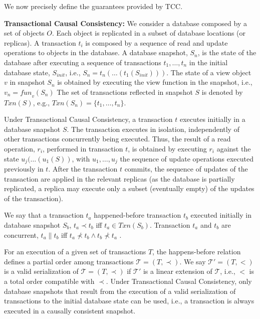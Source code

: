 \documentclass[sigplan,review,anonymous]{acmart}
\begin{document}
We now precisely define the guarantees provided by TCC.

\noindent
\textbf{Transactional Causal Consistency:}
We consider a database composed by a set of objects $O$. Each object is replicated in a subset of 
database locations (or replicas).
A transaction $t_i$ is composed by a sequence of read and update operations to objects in the database.
A database snapshot, $S_n$, is the state of the database after executing a sequence of 
transactions $t_1,\ldots,t_n$ in the initial database state, $S_{init}$, i.e., $S_n =
t_n(\ldots(t_1(S_{init})))$.  The state of a view object $v$ in snapshot $S_n$ is obtained by executing
the view function in the snapshot, i.e.,  $v_n = \mathit{fun}_v(S_n)$
The set of transactions reflected in snapshot $S$ is denoted by $Txn(S)$,
e.g., $Txn(S_n) = \{t_1,\ldots,t_n\}$.

Under Transactional Causal Consistency, a transaction $t$  executes initially in a database snapshot $S$.
The transaction executes in isolation, independently of other transactions concurrently being executed. 
Thus, the result of a read operation, $r_i$, performed in transaction $t$, is obtained by executing $r_i$
against the state $u_j(\ldots(u_1(S))$, with $u_1,\ldots,u_j$ the sequence of update operations executed 
previously in $t$. After the transaction $t$ commits, the sequence of updates of the transaction are applied
in the relevant replicas (as the database is partially replicated, a replica may execute only a subset (eventually empty) 
of the updates of the transaction).

We say that a transaction $t_a$
happened-before transaction $t_b$ executed initially in  database snapshot $S_b$,
$t_a \! \prec \! t_b$ iff \mbox{$t_a \!\in \! Txn(S_b)$}.
Transaction $t_a$ and $t_b$ are concurrent, $t_a \parallel  t_b$ iff
$t_a \! \not \prec \! t_b  \wedge  t_b \! \not \prec \! t_a$ \cite{lamport78}.

For an execution of a given set of transactions $T$, the happens-before relation defines
a partial order among transactions \mbox{$\mathcal{T} = (T,\prec)$}.
We say $\mathcal{T'} = (T,<)$ is a valid serialization of $\mathcal{T} = (T,\prec)$
if $\mathcal{T'}$ is a linear extension of $\mathcal{T}$, i.e., $<$ is a total order
compatible with $\prec$.
Under Transactional Causal Consistency, only database snapshots that result from the 
execution of a valid serialization of transactions to the initial database state can be used, i.e.,
a transaction is always executed in a causally consistent snapshot.
\end{document}
